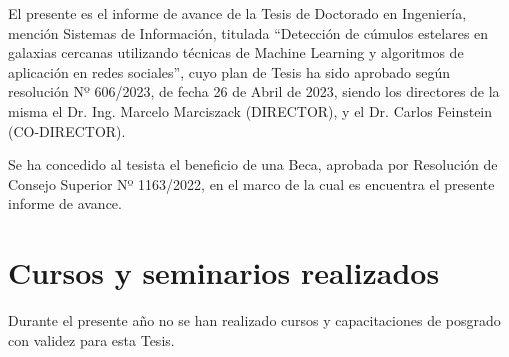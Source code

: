 \documentclass[
	11pt,oneside,a4paper,
	fleqn,
	article
]{memoir}
\begin{document}


\newpage

El presente es el informe de avance de la Tesis de Doctorado en Ingeniería, mención Sistemas de Información, titulada ``Detección de cúmulos estelares en galaxias cercanas utilizando técnicas de Machine Learning y algoritmos de aplicación en redes sociales'', cuyo plan de Tesis ha sido aprobado según resolución Nº 606/2023, de fecha 26 de Abril de 2023, siendo los directores de la misma el Dr. Ing. Marcelo Marciszack (DIRECTOR), y el Dr. Carlos Feinstein (CO-DIRECTOR).

Se ha concedido al tesista el beneficio de una Beca, aprobada por Resolución de Consejo Superior Nº 1163/2022, en el marco de la cual es encuentra el presente informe de avance.

\tableofcontents

\section {Cursos y seminarios realizados}

Durante el presente año no se han realizado cursos y capacitaciones de posgrado con validez para esta Tesis.



\end{document}
